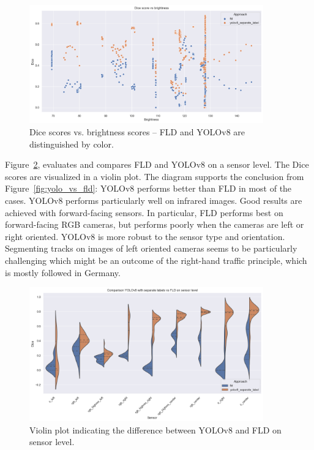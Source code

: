 \documentclass[Master,MDS,english]{BASE/twbook} %
\begin{document}
\begin{figure}[h]
\centering
\includegraphics[width=0.9\textwidth]{images/results/dice_vs_brightness_nl}
\caption{Dice scores vs. brightness scores -- FLD and YOLOv8 are distinguished by color.  }
\label{fig:dice_vs_brightness}
\end{figure}



Figure~\ref{fig:yolo_models2}, evaluates and compares FLD and YOLOv8 on a sensor level. 
The Dice scores are visualized in a violin plot.
The diagram supports the conclusion from Figure~\ref{fig:yolo_vs_fld}: YOLOv8 performs better than FLD in most of the cases. YOLOv8 performs particularly well on infrared images. Good results are achieved with forward-facing sensors. In particular, FLD performs best on forward-facing RGB cameras, but performs poorly when the cameras are left or right oriented. YOLOv8 is more robust to the sensor type and orientation. Segmenting tracks on images of left oriented cameras seems to be particularly challenging which might be an outcome of the right-hand traffic principle, which is mostly followed in Germany.


\begin{figure}[H]
\centering
\includegraphics[width=0.9\textwidth]{images/results/violin_plot_nl}
\caption{Violin plot indicating the difference between YOLOv8 and FLD on sensor level.  }
\label{fig:yolo_models2}
\end{figure}
\end{document}
